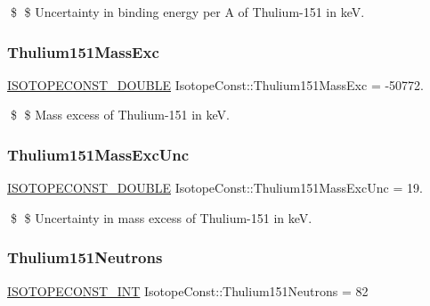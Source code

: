 \$ \$ Uncertainty in binding energy per A of Thulium-\/151 in keV. \mbox{\label{group___isotope_const-_thulium-_tm151_gadaccc647effa8ad634dae3753fb8d9bd}} 
\subsubsection{\texorpdfstring{Thulium151\+Mass\+Exc}{Thulium151MassExc}}
{\footnotesize\ttfamily \mbox{\hyperlink{group___isotope_const-_macros_ga8f45a7272ce02c0b4c65c44636ed719a}{I\+S\+O\+T\+O\+P\+E\+C\+O\+N\+S\+T\+\_\+\+D\+O\+U\+B\+LE}} Isotope\+Const\+::\+Thulium151\+Mass\+Exc = -\/50772.}

\$ \$ Mass excess of Thulium-\/151 in keV. \mbox{\label{group___isotope_const-_thulium-_tm151_ga2e307386fdd5371bcd519242a9cf8eb1}} 
\subsubsection{\texorpdfstring{Thulium151\+Mass\+Exc\+Unc}{Thulium151MassExcUnc}}
{\footnotesize\ttfamily \mbox{\hyperlink{group___isotope_const-_macros_ga8f45a7272ce02c0b4c65c44636ed719a}{I\+S\+O\+T\+O\+P\+E\+C\+O\+N\+S\+T\+\_\+\+D\+O\+U\+B\+LE}} Isotope\+Const\+::\+Thulium151\+Mass\+Exc\+Unc = 19.}

\$ \$ Uncertainty in mass excess of Thulium-\/151 in keV. \mbox{\label{group___isotope_const-_thulium-_tm151_ga2468c36827f31515f20e96dbc5de1609}} 
\subsubsection{\texorpdfstring{Thulium151\+Neutrons}{Thulium151Neutrons}}
{\footnotesize\ttfamily \mbox{\hyperlink{group___isotope_const-_macros_ga5f18360b3e99483a35c32d789e62621c}{I\+S\+O\+T\+O\+P\+E\+C\+O\+N\+S\+T\+\_\+\+I\+NT}} Isotope\+Const\+::\+Thulium151\+Neutrons = 82}

